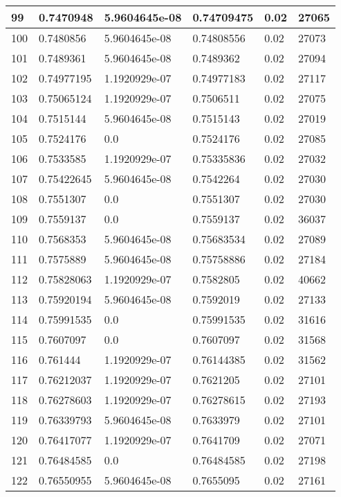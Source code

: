 \begin{longtable}{|l|l|l|l|l|l|}
99 & 0.7470948 & 5.9604645e-08 & 0.74709475 & 0.02 & 27065 \\ \hline 
100 & 0.7480856 & 5.9604645e-08 & 0.74808556 & 0.02 & 27073 \\ \hline 
101 & 0.7489361 & 5.9604645e-08 & 0.7489362 & 0.02 & 27094 \\ \hline 
102 & 0.74977195 & 1.1920929e-07 & 0.74977183 & 0.02 & 27117 \\ \hline 
103 & 0.75065124 & 1.1920929e-07 & 0.7506511 & 0.02 & 27075 \\ \hline 
104 & 0.7515144 & 5.9604645e-08 & 0.7515143 & 0.02 & 27019 \\ \hline 
105 & 0.7524176 & 0.0 & 0.7524176 & 0.02 & 27085 \\ \hline 
106 & 0.7533585 & 1.1920929e-07 & 0.75335836 & 0.02 & 27032 \\ \hline 
107 & 0.75422645 & 5.9604645e-08 & 0.7542264 & 0.02 & 27030 \\ \hline 
108 & 0.7551307 & 0.0 & 0.7551307 & 0.02 & 27030 \\ \hline 
109 & 0.7559137 & 0.0 & 0.7559137 & 0.02 & 36037 \\ \hline 
110 & 0.7568353 & 5.9604645e-08 & 0.75683534 & 0.02 & 27089 \\ \hline 
111 & 0.7575889 & 5.9604645e-08 & 0.75758886 & 0.02 & 27184 \\ \hline 
112 & 0.75828063 & 1.1920929e-07 & 0.7582805 & 0.02 & 40662 \\ \hline 
113 & 0.75920194 & 5.9604645e-08 & 0.7592019 & 0.02 & 27133 \\ \hline 
114 & 0.75991535 & 0.0 & 0.75991535 & 0.02 & 31616 \\ \hline 
115 & 0.7607097 & 0.0 & 0.7607097 & 0.02 & 31568 \\ \hline 
116 & 0.761444 & 1.1920929e-07 & 0.76144385 & 0.02 & 31562 \\ \hline 
117 & 0.76212037 & 1.1920929e-07 & 0.7621205 & 0.02 & 27101 \\ \hline 
118 & 0.76278603 & 1.1920929e-07 & 0.76278615 & 0.02 & 27193 \\ \hline 
119 & 0.76339793 & 5.9604645e-08 & 0.7633979 & 0.02 & 27101 \\ \hline 
120 & 0.76417077 & 1.1920929e-07 & 0.7641709 & 0.02 & 27071 \\ \hline 
121 & 0.76484585 & 0.0 & 0.76484585 & 0.02 & 27198 \\ \hline 
122 & 0.76550955 & 5.9604645e-08 & 0.7655095 & 0.02 & 27161 \\ \hline 

\end{longtable}
